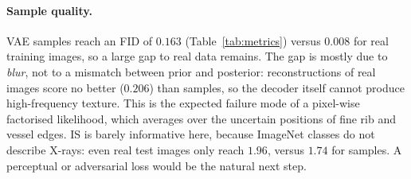 \documentclass{article}
\begin{document}
\paragraph{Sample quality.}
VAE samples reach an FID of $0.163$ (Table~\ref{tab:metrics}) versus $0.008$ for real
training images, so a large gap to real data remains. The gap is mostly
due to \emph{blur}, not to a mismatch between prior and posterior:
reconstructions of real images score no better ($0.206$) than samples,
so the decoder itself cannot produce high-frequency texture. This is the
expected failure mode of a pixel-wise factorised likelihood, which
averages over the uncertain positions of fine rib and vessel edges. IS is barely informative here, because ImageNet classes do not
describe X-rays: even real test images only reach $1.96$, versus $1.74$
for samples. A perceptual or adversarial loss would be the natural next step.
\end{document}
